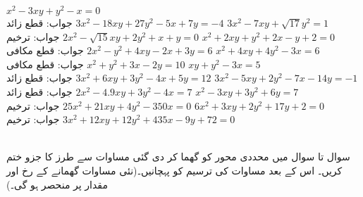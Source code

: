 $x^2-3xy+y^2-x=0$\\
جواب:\quad
قطع زائد
$3x^2-18xy+27y^2-5x+7y=-4$
$3x^2-7xy+\sqrt{17}y^2=1$\\
جواب:\quad
ترخیم
$2x^2-\sqrt{15}xy+2y^2+x+y=0$
$x^2+2xy+y^2+2x-y+2=0$\\
جواب:\quad
قطع مکافی
$2x^2-y^2+4xy-2x+3y=6$
$x^2+4xy+4y^2-3x=6$\\
جواب:\quad
قطع مکافی
$x^2+y^2+3x-2y=10$
$xy+y^2-3x=5$\\
جواب:\quad
قطع زائد
$3x^2+6xy+3y^2-4x+5y=12$
$3x^2-5xy+2y^2-7x-14y=-1$\\
جواب:\quad
قطع زائد
$2x^2-4.9xy+3y^2-4x=7$
$x^2-3xy+3y^2+6y=7$\\
جواب:\quad
ترخیم
$25x^2+21xy+4y^2-350x=0$
$6x^2+3xy+2y^2+17y+2=0$\\
جواب:\quad
ترخیم
$3x^2+12xy+12y^2+435x-9y+72=0$

\\
سوال  تا سوال  میں محددی محور کو گھما کر دی گئی مساوات سے  طرز کا جزو ختم کریں۔ اس کے بعد مساوات کی ترسیم کو پہچانیں۔(نئی مساوات گھمانے کے رخ اور مقدار پر منحصر ہو گی۔) 

